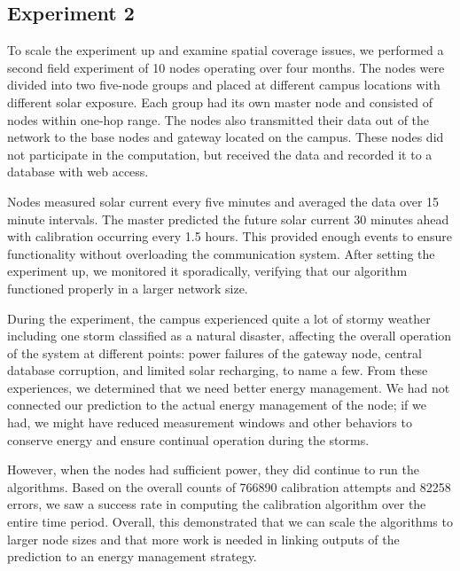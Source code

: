 \documentclass[prodmode,acmtosn]{acmsmall}
\begin{document}
\subsection{Experiment 2}
To scale the experiment up and examine spatial coverage issues, we performed a second field experiment of 10 nodes operating over four months.
The nodes were divided into two five-node groups and placed at different campus locations with different solar exposure.
Each group had its own master node and consisted of nodes within one-hop range.
The nodes also transmitted their data out of the network to the base nodes and gateway located on the campus.
These nodes did not participate in the computation, but received the data and recorded it to a database with web access.

Nodes measured solar current every five minutes and averaged the data over 15 minute intervals.
The master predicted the future solar current 30 minutes ahead with calibration occurring every 1.5 hours.
This provided enough events to ensure functionality without overloading the communication system.
After setting the experiment up, we monitored it sporadically, verifying that our algorithm functioned properly in a larger network size.

During the experiment, the campus experienced quite a lot of stormy weather including one storm classified as a natural disaster, affecting the overall operation of the system at different points: power failures of the gateway node, central database corruption, and limited solar recharging, to name a few.
From these experiences, we determined that we need better energy management.
We had not connected our prediction to the actual energy management of the node; if we had, we might have reduced measurement windows and other behaviors to conserve energy and ensure continual operation during the storms.

However, when the nodes had sufficient power, they did continue to run the algorithms.
Based on the overall counts of 766890 calibration attempts and 82258 errors, we saw a  success rate in computing the calibration algorithm over the entire time period.
Overall, this demonstrated that we can scale the algorithms to larger node sizes and that more work is needed in linking outputs of the prediction to an energy management strategy. \newline

\begin{table*}
\centering
{}
\end{table*}
\end{document}
